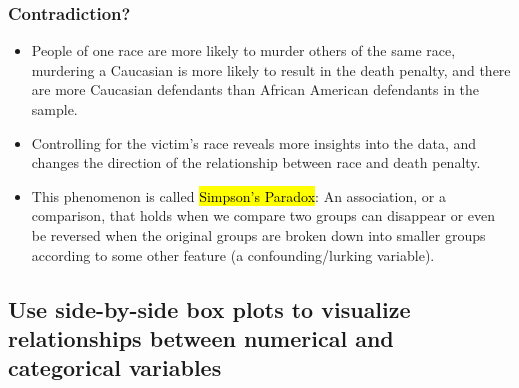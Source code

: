 \documentclass[slidestop,compress,mathserif,12pt,t,professionalfonts,xcolor=table]{beamer}
\begin{document}

\begin{frame}
\frametitle{Contradiction?}

\begin{itemize}

\item People of one race are more likely to murder others of the same race, murdering a Caucasian is more likely to result in the death penalty, and there are more Caucasian defendants than African American defendants in the sample.

\pause

\item Controlling for the victim's race reveals more insights into the data, and changes the direction of the relationship between race and death penalty.

\pause

\item This phenomenon is called \hl{Simpson's Paradox}: An association, or a comparison, that holds when we compare two groups can disappear or even be reversed when the original groups are broken down into smaller groups according to some other feature (a confounding/lurking variable).

\end{itemize}

\note{

}

\end{frame}


\subsection{Use side-by-side box plots to visualize relationships between numerical and categorical variables}
\label{mi7}

\end{document}

